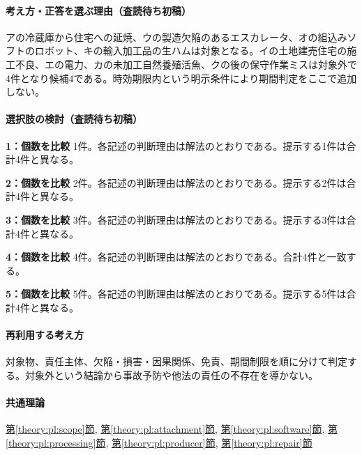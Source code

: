 \paragraph{考え方・正答を選ぶ理由（査読待ち初稿）} アの冷蔵庫から住宅への延焼、ウの製造欠陥のあるエスカレータ、オの組込みソフトのロボット、キの輸入加工品の生ハムは対象となる。イの土地建売住宅の施工不良、エの電力、カの未加工自然養殖活魚、クの後の保守作業ミスは対象外で4件となり候補4である。時効期限内という明示条件により期間判定をここで追加しない。

\paragraph{選択肢の検討（査読待ち初稿）}\mbox{}\par

\noindent\textbf{1：個数を比較} 1件。各記述の判断理由は解法のとおりである。提示する1件は合計4件と異なる。\par

\noindent\textbf{2：個数を比較} 2件。各記述の判断理由は解法のとおりである。提示する2件は合計4件と異なる。\par

\noindent\textbf{3：個数を比較} 3件。各記述の判断理由は解法のとおりである。提示する3件は合計4件と異なる。\par

\noindent\textbf{4：個数を比較} 4件。各記述の判断理由は解法のとおりである。合計4件と一致する。\par

\noindent\textbf{5：個数を比較} 5件。各記述の判断理由は解法のとおりである。提示する5件は合計4件と異なる。\par

\paragraph{再利用する考え方} 対象物、責任主体、欠陥・損害・因果関係、免責、期間制限を順に分けて判定する。対象外という結論から事故予防や他法の責任の不存在を導かない。

\paragraph{共通理論} \hyperref[theory:pl:scope]{第\ref*{theory:pl:scope}節}, \hyperref[theory:pl:attachment]{第\ref*{theory:pl:attachment}節}, \hyperref[theory:pl:software]{第\ref*{theory:pl:software}節}, \hyperref[theory:pl:processing]{第\ref*{theory:pl:processing}節}, \hyperref[theory:pl:producer]{第\ref*{theory:pl:producer}節}, \hyperref[theory:pl:repair]{第\ref*{theory:pl:repair}節}

